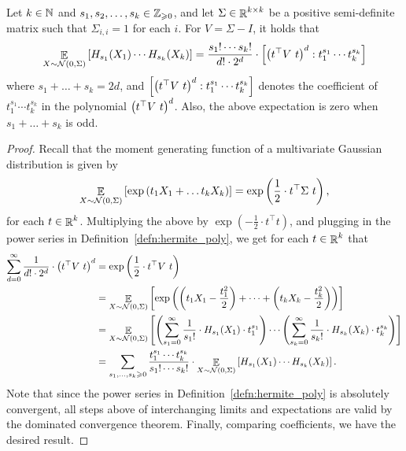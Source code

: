 \begin{lemma}\label{lemma:hermite_exp}
	Let $k\in \mathbb{N}$ and $s_1,s_2,\dots,s_k \in \mathbb{Z}_{\geqslant 0}$, and let $\Sigma\in \mathop{\mathbb{R}}^{k\times k}$ be a positive semi-definite matrix such that $\Sigma_{i,i}=1$ for each $i$.	
	For $V=\Sigma-I$, it holds that \[\mathop{\mathbb{E}}_{X\sim \mathcal N(0,\Sigma)}\left[ H_{s_1}(X_1)\cdots H_{s_k}(X_k) \right] = \frac{s_1!\cdots s_k!}{d!\cdot 2^d}\cdot \left[ \left( t^{\top}V\ t \right)^d : t_1^{s_1}\cdots t_k^{s_k} \right] \]
	where $s_1+\dots+s_k = 2d$, and $\left[ \left( t^{\top}V\ t \right)^d: t_1^{s_1}\cdots t_k^{s_k} \right]$ denotes the coefficient of $t_1^{s_1}\cdots t_k^{s_k}$ in the polynomial $\brac{t^{\top}V\ t}^d$.
	Also, the above expectation is zero when $s_1+\dots+s_k$ is odd.
\end{lemma}
\begin{proof}
	Recall that the moment generating function of a multivariate Gaussian distribution is given by
	\[\mathop{\mathbb{E}}_{X\sim \mathcal N(0,\Sigma)}\left[ \exp\left( t_1X_1+\dots t_kX_k \right) \right] = \exp\left( \frac{1}{2}\cdot t^{\top}\Sigma\ t \right),\]
	for each $t\in \mathop{\mathbb{R}}^k$.
	Multiplying the above by $\exp(-\frac{1}{2}\cdot t^\top t)$, and plugging in the power series in Definition~\ref{defn:hermite_poly}, we get for each $t\in \mathop{\mathbb{R}}^k$ that
	\begin{align*}
		\sum_{d=0}^{\infty} \frac{1}{d!\cdot 2^d}\cdot \brac{t^{\top}V\ t}^d
		&= \exp\brac{\frac{1}{2}\cdot t^{\top}V\ t} 
		\\&= \E_{X\sim \mc N(0,\Sigma)}\sqbrac{ \exp\brac{\brac{t_1X_1-\frac{t_1^2}{2}}+\dots +\brac{t_kX_k -\frac{t_k^2}{2}} } }
		\\&= \E_{X\sim \mc N(0, \Sigma)}\sqbrac{ \brac{\sum_{s_1=0}^\infty \frac{1}{s_1!}\cdot H_{s_1}(X_1)\cdot t_1^{s_1} }\cdots \brac{\sum_{s_k=0}^\infty \frac{1}{s_k!}\cdot H_{s_k}(X_k)\cdot t_k^{s_k}}}
		\\&= \sum_{s_1,\dots,s_k\geq 0}\frac{t_1^{s_1}\cdots t_k^{s_k}}{s_1!\cdots s_k!}\cdot \E_{X\sim \mc N(0, \Sigma)}\sqbrac{H_{s_1}(X_1)\cdots H_{s_k}(X_k)}.
	\end{align*}
	Note that since the power series in Definition~\ref{defn:hermite_poly} is absolutely convergent, all steps above of interchanging limits and expectations are valid by the dominated convergence theorem. 
	Finally, comparing coefficients, we have the desired result.
\end{proof}
